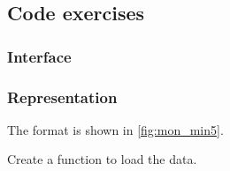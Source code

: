 \subsection{Code exercises}

\subsubsection*{Interface}



\subsubsection*{Representation}



The format is shown in \cref{fig:mon_min5}.



\begin{gradedexercise}[Representation]
  Create a function to load the data.
%

\end{gradedexercise}

